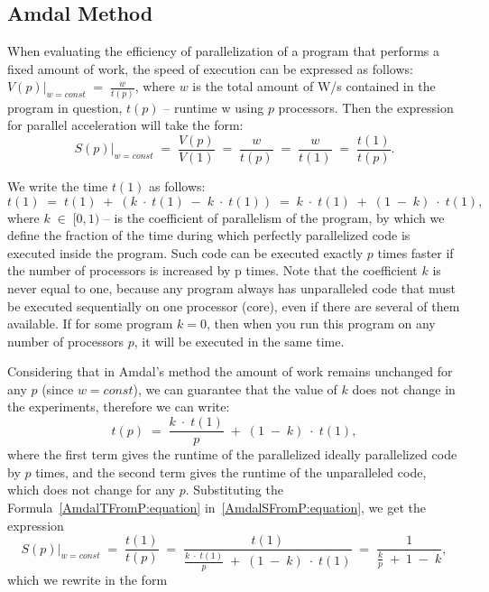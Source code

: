{ %
	\subsection{Amdal Method}
	\par When evaluating the efficiency of parallelization of a program that performs a fixed amount of work, the speed of execution can be expressed as follows:$\left.V(p)\right|_{w=const}\;=\;\frac w{t(p)}$, where $w$  is the total amount of W/s contained in the program in question, $t(p)$ – runtime w using $ p $ processors. Then the expression for parallel acceleration will take the form:
	\begin{equation}
		\label{AmdalSFromP:equation}
		\left.S(p)\right|_{w=const}\;=\;\frac{V(p)}{V(1)}\;=\;\frac w{t(p)}\;=\;\frac w{t(1)}\;=\;\frac{t(1)}{t(p)}.
	\end{equation}
	\par We write the time $t(1)$ as follows:
	\begin{equation}
		t(1)\;=\;t(1)\;+\;(k\;\cdot\;t(1)\;-\;k\;\cdot\;t(1))\;=\;k\;\cdot\;t(1)\;+\;(1\;-\;k)\;\cdot\;t(1),
	\end{equation}
	where $k\;\in\;\lbrack0,1)$ – is the coefficient of parallelism of the program, by which we define the fraction of the time during which perfectly parallelized code is executed inside the program. Such code can be executed exactly $p$ times faster if the number of processors is increased by p times. Note that the coefficient $k$ is never equal to one, because any program always has unparalleled code that must be executed sequentially on one processor (core), even if there are several of them available. If for some program $k =0 $, then when you run this program on any number of processors $p$, it will be executed in the same time.
	\par Considering that in Amdal’s method the amount of work remains unchanged for any $p$ (since $w = const$), we can guarantee that the value of $ k $ does not change in the experiments, therefore we can write:
	\begin{equation}
		\label{AmdalTFromP:equation}
		t(p)\;=\;\frac{k\;\cdot\;t(1)}p\;+\;(1\;-\;k)\;\cdot\;t(1),
	\end{equation}
where the first term gives the runtime of the parallelized ideally parallelized code by $p$ times, and the second term gives the runtime of the unparalleled code, which does not change for any $p$. Substituting the Formula~\eqref{AmdalTFromP:equation} in~\eqref{AmdalSFromP:equation}, we get the expression $$\left.S(p)\right|_{w=const}\;=\;\frac{t(1)}{t(p)}\;=\;\frac{t(1)}{{\displaystyle\frac{k\;\cdot\;t(1)}p}\;+\;(1\;-\;k)\;\cdot\;t(1)}\;=\;\frac1{{\displaystyle\frac kp}\;+\;1\;-\;k},$$ which we rewrite in the form
}
